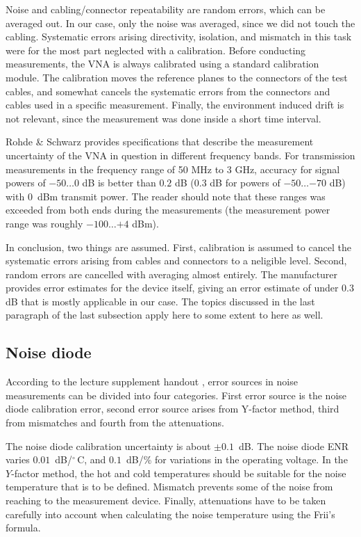 \documentclass[a4paper, 12pt]{article}
\begin{document}
Noise and cabling/connector repeatability are random errors, which can be averaged 
out. In our case, only the noise was averaged, since we did not touch the cabling. 
Systematic errors arising directivity, isolation, and mismatch in this task were
for the most part neglected with a calibration. Before conducting measurements, 
the VNA is always calibrated using a standard calibration module. The calibration 
moves the reference planes to the connectors of the test cables, and somewhat 
cancels the systematic errors from the connectors and cables used in a specific 
measurement. Finally, the environment induced drift is not relevant, since the 
measurement was done inside a short time interval.

Rohde \& Schwarz provides specifications that describe the measurement uncertainty 
of the VNA in question in different frequency bands. For transmission measurements 
in the frequency range of 50 MHz to 3 GHz, accuracy for signal powers of $-50 \ldots 0$ 
dB is better than $0.2$ dB ($0.3$ dB for powers of $-50 \ldots {-70}$ dB) with 0~dBm 
transmit power. \cite{vna} The reader should note that these ranges was exceeded 
from both ends during the measurements (the measurement power range was roughly 
$-100 \ldots {+4}$ dBm). 

In conclusion, two things are assumed. First, calibration is assumed to cancel the 
systematic errors arising from cables and connectors to a neligible level. Second, 
random errors are cancelled with averaging almost entirely. The manufacturer provides 
error estimates for the device itself, giving an error estimate of under $0.3$ dB that 
is mostly applicable in our case. The topics discussed in the last paragraph of the 
last subsection apply here to some extent to here as well.


\subsection{Noise diode}

According to the lecture supplement handout \cite{kakkaa_huuleen}, error sources in noise 
measurements can be divided into four categories. First error source is the noise diode 
calibration error, second error source arises from Y-factor method, third from mismatches 
and fourth from the attenuations.

The noise diode calibration uncertainty is about $\pm0.1$~dB. The noise diode ENR varies 
$0.01$~dB/${}^\circ \mathrm{\,C}$, and $0.1$~dB/\% for variations in the operating voltage. 
In the $Y$-factor method, the hot and cold temperatures should be suitable for the noise 
temperature that is to be defined. Mismatch prevents some of the noise from reaching to 
the measurement device. Finally, attenuations have to be taken carefully into account when 
calculating the noise temperature using the Frii's formula.
\end{document}
